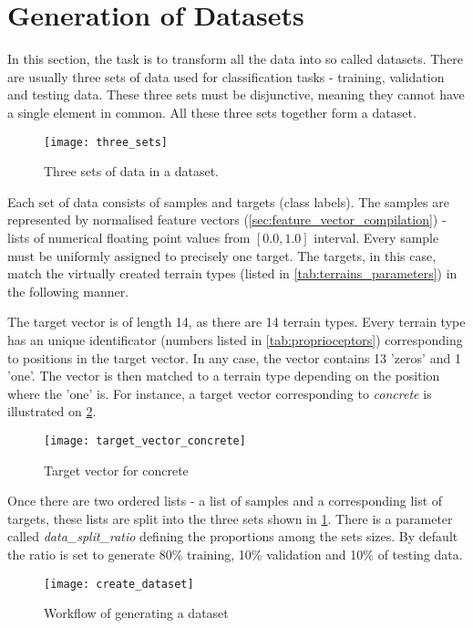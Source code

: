 \section{Generation of Datasets} \label{sec:dataset_creation}
In this section, the task is to transform all the data into so called datasets. There are usually three sets of data used for classification tasks - training, validation and testing data. These three sets must be disjunctive, meaning they cannot have a single element in common. All these three sets together form a dataset.

\begin{figure}[H]
  \centering
  \texttt{[image: three\_sets]}
  \caption{Three sets of data in a dataset.}
  \label{img:three_sets}
\end{figure}

Each set of data consists of samples and targets (class labels). The samples are represented by normalised feature vectors (\cref{sec:feature_vector_compilation}) - lists of numerical floating point values from $ [0.0, 1.0] $ interval. Every sample must be uniformly assigned to precisely one target. The targets, in this case, match the virtually created terrain types (listed in \cref{tab:terrains_parameters}) in the following manner.

The target vector is of length 14, as there are 14 terrain types. Every terrain type has an unique identificator (numbers listed in \cref{tab:proprioceptors}) corresponding to positions in the target vector. In any case, the vector contains 13 'zeros' and 1 'one'. The vector is then matched to a terrain type depending on the position where the 'one' is. For instance, a target vector corresponding to \textit{concrete} is illustrated on \cref{img:target_vector_concrete}.

\begin{figure}[H]
  \centering
  \texttt{[image: target\_vector\_concrete]}
  \caption{Target vector for concrete}
  \label{img:target_vector_concrete}
\end{figure}

Once there are two ordered lists - a list of samples and a corresponding list of targets, these lists are split into the three sets shown in \cref{img:three_sets}. There is a parameter called \textit{data\_split\_ratio} defining the proportions among the sets sizes. By default the ratio is set to generate 80\% training, 10\% validation and 10\% of testing data.

\begin{figure}[H]
  \centering
  \texttt{[image: create\_dataset]}
  \caption{Workflow of generating a dataset}
  \label{img:create_dataset}
\end{figure}

